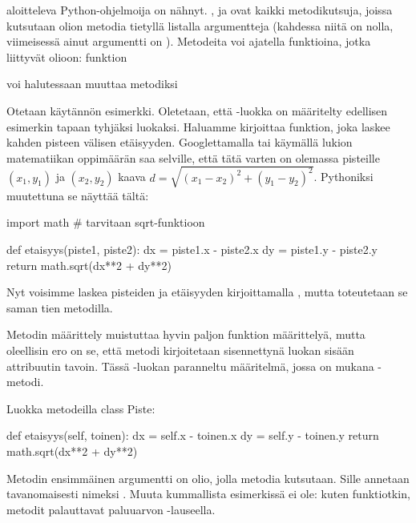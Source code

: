  aloitteleva Python-ohjelmoija on nähnyt. ,  ja  ovat kaikki metodikutsuja, joissa kutsutaan olion metodia tietyllä listalla argumentteja (kahdessa niitä on nolla, viimeisessä ainut argumentti on ). Metodeita voi ajatella funktioina, jotka liittyvät olioon: funktion


voi halutessaan muuttaa metodiksi


Otetaan käytännön esimerkki. Oletetaan, että -luokka on määritelty edellisen esimerkin tapaan tyhjäksi luokaksi. Haluamme kirjoittaa funktion, joka laskee kahden pisteen välisen etäisyyden. Googlettamalla tai käymällä lukion matematiikan oppimäärän saa selville, että tätä varten on olemassa pisteille $(x_1,y_1)$ ja $(x_2,y_2)$ kaava $d = \sqrt{(x_1 - x_2)^2 + (y_1 - y_2)^2}$. Pythoniksi muutettuna se näyttää tältä:

\begin{python}
import math # tarvitaan sqrt-funktioon

def etaisyys(piste1, piste2):
       dx = piste1.x - piste2.x
       dy = piste1.y - piste2.y
       return math.sqrt(dx**2 + dy**2)
\end{python}

Nyt voisimme laskea pisteiden  ja  etäisyyden kirjoittamalla , mutta toteutetaan se saman tien metodilla.

Metodin määrittely muistuttaa hyvin paljon funktion määrittelyä, mutta oleellisin ero on se, että metodi kirjoitetaan sisennettynä luokan sisään attribuutin tavoin. Tässä -luokan paranneltu määritelmä, jossa on mukana -metodi.

\begin{example}{Luokka metodeilla}
class Piste:
       
       def etaisyys(self, toinen):
              dx = self.x - toinen.x
              dy = self.y - toinen.y
              return math.sqrt(dx**2 + dy**2)
\end{example}

Metodin ensimmäinen argumentti on olio, jolla metodia kutsutaan. Sille annetaan tavanomaisesti nimeksi . Muuta kummallista esimerkissä ei ole: kuten funktiotkin, metodit palauttavat paluuarvon -lauseella.


